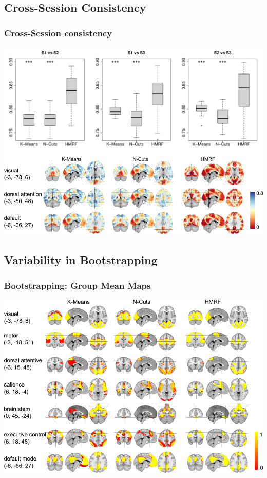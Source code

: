 \documentclass[sansserif, 10pt]{beamer}
\begin{document}
\subsection{Cross-Session Consistency}
\begin{frame}
  \frametitle{Cross-Session consistency}
  \centering
   {
    \includegraphics[width = 1\textwidth]{sfig/boxplot}\\
  }
   {
    \includegraphics[width = 1\textwidth]{sfig/012variance}
  }
\end{frame}


\subsection{Variability in Bootstrapping}
\begin{frame}
\frametitle{Bootstrapping: Group Mean Maps}
\centering
\includegraphics[width = 1\textwidth]{sfig/grp_mean}
\end{frame}
\end{document}
